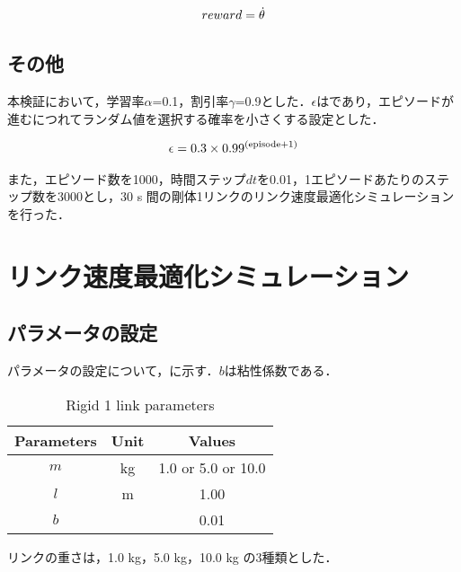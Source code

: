 \begin{eqnarray}
  \equlabel{3.15}
  reward = \dot{\theta}
\end{eqnarray}

\subsection{その他}
本検証において，学習率$\alpha$=0.1，割引率$\gamma$=0.9とした．$\epsilon$はであり，エピソードが進むにつれてランダム値を選択する確率を小さくする設定とした．

\begin{eqnarray}
  \equlabel{3.16}
  \epsilon = 0.3 \times 0.99^{(\mathrm{episode} + 1)}
\end{eqnarray}

また，エピソード数を1000，時間ステップ$dt$を0.01，1エピソードあたりのステップ数を3000とし，30 s 間の剛体1リンクのリンク速度最適化シミュレーションを行った．
\section{リンク速度最適化シミュレーション}
\subsection{パラメータの設定}
パラメータの設定について，に示す．$b$は粘性係数である．
\begin{table}[tb]
  \begin{center}
    \caption{Rigid 1 link parameters}
    \begin{tabular}{c|c|c}
      \hline
      Parameters & Unit & Values \\
      \hline
      $m$ & kg & 1.0 or 5.0 or 10.0\\
      $l$ & m & 1.00 \\
      $b$ &  & 0.01 \\
      \hline
    \end{tabular}
  \end{center}
\end{table}
リンクの重さは，1.0 kg，5.0 kg，10.0 kg の3種類とした．
